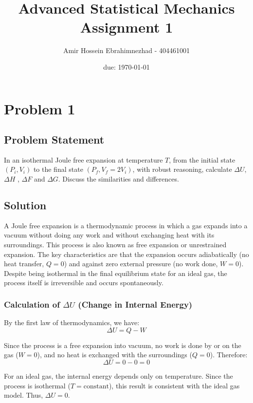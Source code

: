 \documentclass[10pt,twocoloumn]{article}
\title{Advanced Statistical Mechanics Assignment 1}
\author{Amir Hossein Ebrahimnezhad - 404461001}
\date{due: \today}
\begin{document}
\maketitle
\section*{Problem 1}
\subsection*{Problem Statement}
In an isothermal Joule free expansion at temperature $T$, from the initial state $(P_i,V_i)$ to the final state $(P_f,V_f = 2V_i)$, with robust reasoning, calculate $\Delta U$, $\Delta H$ , $\Delta F$ and $\Delta G$. Discuss the similarities and differences.

\subsection*{Solution}

A Joule free expansion is a thermodynamic process in which a gas expands into a vacuum without doing any work and without exchanging heat with its surroundings. This process is also known as free expansion or unrestrained expansion. The key characteristics are that the expansion occurs adiabatically (no heat transfer, $Q = 0$) and against zero external pressure (no work done, $W = 0$). Despite being isothermal in the final equilibrium state for an ideal gas, the process itself is irreversible and occurs spontaneously.

\subsubsection*{Calculation of $\Delta U$ (Change in Internal Energy)}

By the first law of thermodynamics, we have:
\begin{equation}\Delta U = Q - W\end{equation}

Since the process is a free expansion into vacuum, no work is done by or on the gas ($W = 0$), and no heat is exchanged with the surroundings ($Q = 0$). Therefore:
\begin{equation}\Delta U = 0 - 0 = 0\end{equation}

For an ideal gas, the internal energy depends only on temperature. Since the process is isothermal ($T = \text{constant}$), this result is consistent with the ideal gas model. Thus, $\boxed{\Delta U = 0}$.
\end{document}
